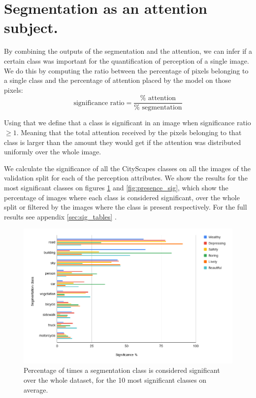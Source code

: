 \section{Segmentation as an attention subject.}
\label{sec:significance}

By combining the outputs of the segmentation and the attention, we can infer if a certain class was
important for the quantification of perception of a single image. We do this by computing the ratio between
the percentage of pixels belonging to a single class and the percentage of attention placed by the model on
those pixels:
\begin{equation}
	\text{significance ratio} = \frac{\% \text{ attention}}{ \% \text{ segmentation}}
\end{equation}

Using that we define that a class is significant in an image when significance ratio $\geq 1$.
Meaning that the total attention received by the pixels belonging to that class is larger
than the amount they would get if the attention was distributed uniformly over the whole image.

We calculate the significance of all the CityScapes classes
on all the images of the validation split for each of the perception attributes. We show
the results for the most significant classes on figures \ref{fig:total_sig} and \ref{fig:presence_sig}, which show the percentage
of images where each class is considered significant, over the whole split or filtered by the images
where the class is present respectively. For the full results see appendix \ref{sec:sig_tables} .

\begin{figure}[ht]
	\begin{center}
	\includegraphics[width=1\textwidth]{./figures/total_significance.png}
	\caption[Percentage of class significance when total]{
		Percentage of times a segmentation class is considered significant over the whole dataset, for the
		10 most significant classes on average.
        }
	\label{fig:total_sig}
	\end{center}
\end{figure}

